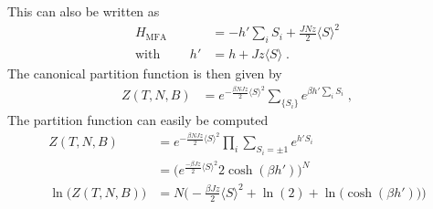 %
%
This can also be written as
\begin{align}\label{eq:ising:H:mfa}
H_\text{MFA} &=
  - h '\sum_{i} S_{i}
+ \frac{J N z}{2}  \langle S \rangle^{2}
 \\
\text{with }\qquad h' &= h + Jz \langle S \rangle\;.
\end{align}
The canonical partition function is then given by
%
\begin{align}\label{eq:ising:mfa:aux1}
Z(T,N,B) &= e^{-\frac{ \beta N J z}{2}\langle S \rangle^{2}} \sum_{\{S_{i}\}} e^{\beta h'\sum_{i}S_{i}}\;,
\end{align}
%
The partition function can easily be computed
%
\begin{align}\label{eq:}
Z(T,N,B) &= e^{-\frac{\beta N J z}{2} \langle S \rangle^{2}}\prod_{i} \sum_{S_{i}=\pm 1} e^{h' S_{i}} \nonumber\\
&= \bigg(  e^{\frac{-\beta J z}{2} \langle S \rangle^{2}}2 \cosh(\beta h') \bigg)^{N}\\
\ln\big( Z(T,N,B)  \big)
&= N \bigg( -\frac{\beta J z}{2} \langle S \rangle^{2} 
+\ln(2) 
+\ln\big( \cosh(\beta h')   \big) 
\bigg)
\label{eq:Z:Ising:MFA}
\end{align}
%
